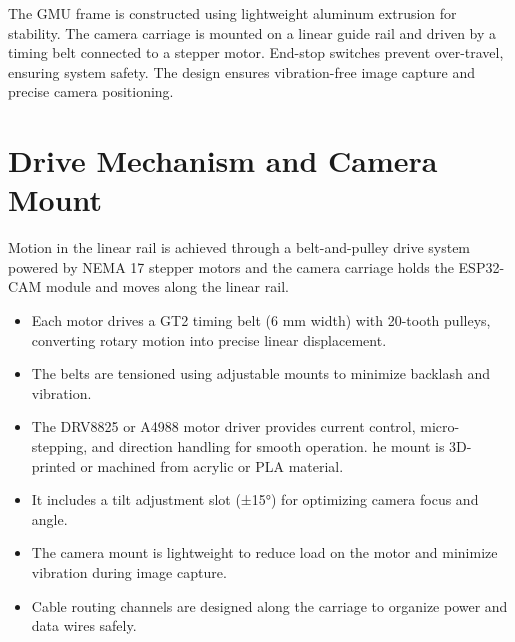 \documentclass[../main]{subfiles}
\begin{document}
\vspace{0.8em}
\vspace{3mm}


The GMU frame is constructed using lightweight aluminum extrusion for stability. The camera carriage is mounted on a linear guide rail and driven by a timing belt connected to a stepper motor. End-stop switches prevent over-travel, ensuring system safety. The design ensures vibration-free image capture and precise camera positioning.


\section{Drive Mechanism and Camera Mount}
Motion in the linear rail is achieved through a belt-and-pulley drive system powered by NEMA 17 stepper motors and the camera carriage holds the ESP32-CAM module and moves along the linear rail.
\begin{itemize}
    \item Each motor drives a GT2 timing belt (6 mm width) with 20-tooth pulleys, converting rotary motion into precise linear displacement.

    \item The belts are tensioned using adjustable mounts to minimize backlash and vibration.

    \item The DRV8825 or A4988 motor driver provides current control, micro-stepping, and direction handling for smooth operation.
    he mount is 3D-printed or machined from acrylic or PLA material.

    \item It includes a tilt adjustment slot (±15°) for optimizing camera focus and angle.

     \item The camera mount is lightweight to reduce load on the motor and minimize vibration during image capture.

    \item Cable routing channels are designed along the carriage to organize power and data wires safely.
\end{itemize}
\end{document}
